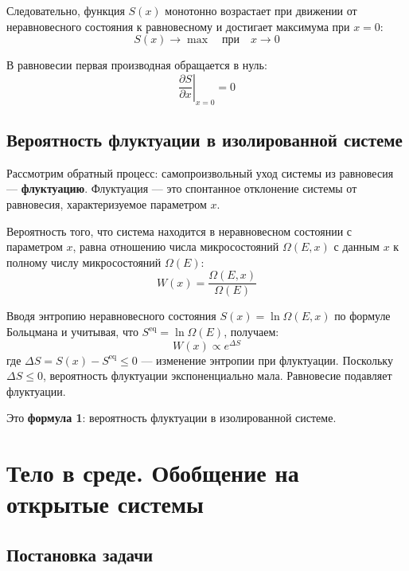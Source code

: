 \documentclass[../general/general]{subfiles}
\begin{document}
Следовательно, функция $S(x)$ монотонно возрастает при движении от неравновесного состояния к равновесному и достигает максимума при $x = 0$:
\begin{equation}
    S(x) \to \max \quad \text{при} \quad x \to 0
\end{equation}

В равновесии первая производная обращается в нуль:
\begin{equation}
    \left.\frac{\partial S}{\partial x}\right|_{x=0} = 0
\end{equation}

\subsection{Вероятность флуктуации в изолированной системе}

Рассмотрим обратный процесс: самопроизвольный уход системы из равновесия --- \textbf{флуктуацию}. Флуктуация --- это спонтанное отклонение системы от равновесия, характеризуемое параметром $x$.

Вероятность того, что система находится в неравновесном состоянии с параметром $x$, равна отношению числа микросостояний $\Omega(E, x)$ с данным $x$ к полному числу микросостояний $\Omega(E)$:
\begin{equation}
    W(x) = \frac{\Omega(E, x)}{\Omega(E)}
\end{equation}

Вводя энтропию неравновесного состояния $S(x) = \ln \Omega(E, x)$ по формуле Больцмана и учитывая, что $S^{\text{eq}} = \ln \Omega(E)$, получаем:
\begin{equation}
    \boxed{W(x) \propto e^{\Delta S}}
    \label{eq:W_isolated}
\end{equation}
где $\Delta S = S(x) - S^{\text{eq}} \leq 0$ --- изменение энтропии при флуктуации. Поскольку $\Delta S \leq 0$, вероятность флуктуации экспоненциально мала. Равновесие подавляет флуктуации.

Это \textbf{формула 1}: вероятность флуктуации в изолированной системе.



\section{Тело в среде. Обобщение на открытые системы}

\subsection{Постановка задачи}
\end{document}
